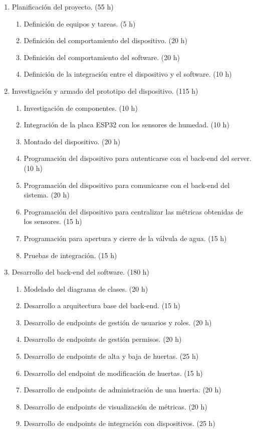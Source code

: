 \documentclass[
11pt, %
codirector, %
]{charter}
\begin{document}
\begin{enumerate}
\item Planificación del proyecto. (55 h)
	\begin{enumerate}
	\item Definición de equipos y tareas. (5 h)
	\item Definición del comportamiento del dispositivo. (20 h)
	\item Definición del comportamiento del software. (20 h)
	\item Definición de la integración entre el dispositivo y el software. (10 h)
	\end{enumerate}
	
\item Investigación y armado del prototipo del dispositivo. (115 h)
	\begin{enumerate}
	\item Investigación de componentes. (10 h)
	\item Integración de la placa ESP32 con los sensores de humedad. (10 h)
	\item Montado del dispositivo. (20 h)
	\item Programación del dispositivo para autenticarse con el back-end del server. (10 h)
	\item Programación del dispositivo para comunicarse con el back-end del sistema. (20 h)
	\item Programación del dispositivo para centralizar las métricas obtenidas de los sensores. (15 h)
	\item Programación para apertura y cierre de la válvula de agua. (15 h)
	\item Pruebas de integración. (15 h)
	\end{enumerate}
	
\item Desarrollo del back-end del software. (180 h)
	\begin{enumerate}
	\item Modelado del diagrama de clases. (20 h)
	\item Desarrollo a arquitectura base del back-end. (15 h)
	\item Desarrollo de endpoints de gestión de usuarios y roles. (20 h)
	\item Desarrollo de endpoints de gestión permisos. (20 h)
	\item Desarrollo de endpoints de alta y baja de huertas. (25 h)
	\item Desarrollo del endpoint de modificación de huertas. (15 h)
	\item Desarrollo de endpoints de administración de una huerta. (20 h)
	\item Desarrollo de endpoints de visualización de métricas. (20 h)
	\item Desarrollo de endpoints de integración con dispositivos. (25 h)
	\end{enumerate}
	

\end{enumerate}
\end{document}
